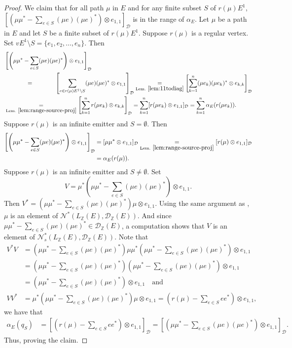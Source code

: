 \documentclass[11pt, letterpaper,final]{amsart}
\newcommand{\ZZ}{\mathbb{Z}}
\newcommand{\D}{\mathcal{D}}
\newcommand{\N}{\mathcal{N}}
\theoremstyle{definition}
\theoremstyle{remark}
\begin{document}
\begin{proof}
We claim that for all path $\mu$ in $E$ and for any finite subset $S$ of $r(\mu)E^1$, $\left[ \left(\mu \mu^* - \sum_{ e \in S } (\mu e)(\mu e)^*\right) \otimes e_{1,1} \right]_{\D}$ is in the range of $\alpha_E$.  Let $\mu$ be a path in $E$ and let $S$ be a finite subset of $r(\mu)E^1$.  Suppose $r(\mu)$ is a regular vertex.  Set $vE^1 \setminus S = \{ e_1, e_2, \ldots, e_n \}$.  Then 
\begin{align*}
&\left[ \left(\mu \mu^* - \sum_{ e \in S } (\mu e) (\mu e)^*\right) \otimes e_{1,1} \right]_{\D} \\
&\underset{\phantom{\text{Lem.}~\ref{lem:11todiag}}}{=} \left[ \sum_{ e \in r(\mu) E^1 \setminus S }  (\mu e) (\mu e)^* \otimes e_{1,1}\right]_{ \D } \underset{\text{Lem.}~\ref{lem:11todiag}}{=}\left[ \sum_{ k=1 }^n (\mu e_k)(\mu e_k)^* \otimes e_{k,k}\right]_{ \D } \\
&\underset{\text{Lem.}~\ref{lem:range-source-proj}}{=}\left[ \sum_{ k=1 }^n  r(\mu e_k) \otimes e_{k,k}\right]_{ \D }  = \sum_{ k = 1}^n [ r( \mu e_k)  \otimes e_{1,1} ]_{ \D }  =  \sum_{ k = 1}^n \alpha_E ( r(\mu e_k) ).
\end{align*}
Suppose $r(\mu)$ is an infinite emitter and $S = \emptyset$.  Then 
\begin{align*}
\left[ \left(\mu \mu^* - \sum_{ e \in S } (\mu e)(\mu e)^*\right) \otimes e_{1,1} \right]_{\D} &= [ \mu \mu^* \otimes e_{1,1}]_{\D}  \underset{\text{Lem.}~\ref{lem:range-source-proj}}{=} [ r(\mu) \otimes e_{1,1}]_{\D} \\
&=  \alpha_E ( r(\mu) ).
\end{align*}
Suppose $r(\mu)$ is an infinite emitter and $S \neq \emptyset$.  Set 
\[V = \mu^*  \left(\mu \mu^* - \sum_{ e \in S } (\mu e)(\mu e)^*\right) \otimes e_{1,1}.\]
Then $V^*=  \left(\mu \mu^* - \sum_{ e \in S } (\mu e)(\mu e)^*\right)\mu \otimes e_{1,1}$.  Using the same argument as \cite[Proof of Lemma~4.1]{BCW2017}, $\mu$ is an element of $\N^*(L_\ZZ(E), \D_\ZZ(E))$.  And since $\mu \mu^* - \sum_{ e \in S } (\mu e)(\mu e)^* \in \D_\ZZ(E)$, a computation shows that $V$ is an element of $\N_s^* (L_\ZZ(E), \D_\ZZ(E))$.  Note that
\begin{align*}
V^*V &= \left(\mu \mu^* - \sum_{ e \in S } (\mu e)(\mu e)^*\right) \mu \mu^* \left(\mu \mu^* - \sum_{ e \in S } (\mu e)(\mu e)^*\right) \otimes e_{1,1} \\
 &= \left(\mu \mu^* - \sum_{ e \in S } (\mu e)(\mu e)^*\right) \left(\mu \mu^* - \sum_{ e \in S } (\mu e)(\mu e)^*\right) \otimes e_{1,1} \\
 &= \left(\mu \mu^* - \sum_{ e \in S } (\mu e)(\mu e)^* \right) \otimes e_{1,1} \quad \text{and} \\
 VV^* &= \mu^*  \left(\mu \mu^* - \sum_{ e \in S }(\mu e)(\mu e)^*\right)\mu \otimes e_{1,1} = \left( r(\mu)  - \sum_{ e \in S } e e^* \right) \otimes e_{1,1},
\end{align*}
we have that 
\begin{align*}
\alpha_E( q_S ) &= \left[ \left( r(\mu) - \sum_{ e \in S} e e^* \right) \otimes e_{1,1} \right]_{ \D} = \left[ \left(\mu \mu^* - \sum_{ e \in S } (\mu e)(\mu e)^*\right) \otimes e_{1,1} \right]_{\D}.
\end{align*}
Thus, proving the claim.


\end{proof}
\end{document}
